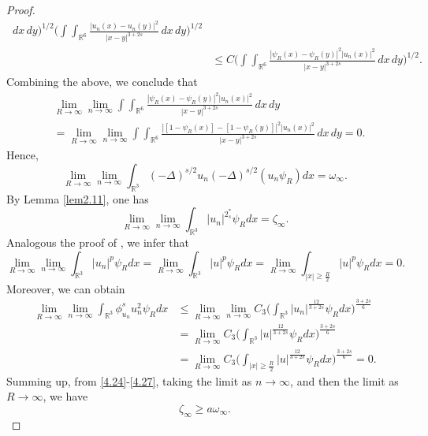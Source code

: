 \documentclass[11pt]{article}
\numberwithin{equation}{section}
\begin{document}
\begin{proof}
\begin{align*}
 \,dx\,dy\Big)^{1/2}
\Big(\int\int_{\mathbb{R}^6}\frac{|u_n(x)-u_n(y)|^2}{|x-y|^{3+2s}}\,dx\,dy\Big)^{1/2}\\
&\leq C\Big(\int\int_{\mathbb{R}^6}\frac{|\psi_R(x)
 -\psi_R(y)|^2|u_{n}(x)|^2}{|x-y|^{3+2s}}\,dx\,dy\Big)^{1/2}.
\end{align*}
Combining the above, we conclude that
\begin{align*}
&\lim_{R\to \infty}\lim_{n\to\infty}\int\int_{\mathbb{R}^6}\frac{|\psi_R(x)
 -\psi_R(y)|^2|u_{n}(x)|^2}{|x-y|^{3+2s}}\,dx\,dy\\
&=\lim_{R\to \infty}\lim_{n\to\infty}\int\int_{\mathbb{R}^6}
 \frac{|[1-\psi_R(x)]-[1-\psi_R(y)]|^2|u_{n}(x)|^2}{|x-y|^{3+2s}}\,dx\,dy=0.
\end{align*}
Hence,
\begin{equation}\label{4.244}
\lim_{R\to \infty}\lim_{n\to\infty}\int_{\mathbb{R}^3}(-\Delta)^{s/2}u_n
(-\Delta)^{s/2}(u_n\psi_R)dx=\omega_\infty.
\end{equation}
By Lemma \ref{lem2.11}, one has
\begin{equation}\label{4.25}
\lim_{R\to \infty}\lim_{n\to\infty}\int_{\mathbb{R}^3}|u_n|^{2^*_s}\psi_R dx
=\zeta_\infty.
\end{equation}
Analogous the proof of \cite[Lemma 3.3]{Z1688}, we infer that
\begin{equation}\label{4.26}
\lim_{R\to \infty}\lim_{n\to\infty}\int_{\mathbb{R}^3}|u_n|^{p}\psi_R dx
=\lim_{R\to \infty}\int_{\mathbb{R}^3}|u|^{p}\psi_R dx
=\lim_{R\to \infty}\int_{|x|\geq\frac{R}{2}}|u|^{p}\psi_R dx=0.
\end{equation}
Moreover, we can obtain
\begin{equation}\label{4.27}
\begin{split}
\lim_{R\to \infty}\lim_{n\to\infty}\int_{\mathbb{R}^3}\phi^s_{u_n}u^2_n\psi_R dx
&\leq  \lim_{R\to \infty}\lim_{n\to\infty} C_3 
 \Big(\int_{\mathbb{R}^3}{|u_n|}^{\frac{12}{3+2s}}\psi_Rdx\Big)^{\frac{3+2s}{6}}\\
&= \lim_{R\to \infty}C_3 
 \Big(\int_{\mathbb{R}^3}{|u|}^{\frac{12}{3+2s}}\psi_Rdx\Big)^{\frac{3+2s}{6}}\\
&= \lim_{R\to \infty}C_3
 \Big(\int_{{|x|\geq\frac{R}{2}}}{|u|}^{\frac{12}{3+2s}}\psi_R dx\Big)^{\frac{3+2s}{6}}=0.
\end{split}
\end{equation}
Summing up, from \eqref{4.24}-\eqref{4.27}, taking the limit as $n\to \infty$,
and then the limit as $R\to\infty$, we have
$$
\zeta_\infty \geq a\omega_\infty.
$$
\smallskip


\end{proof}
\end{document}
